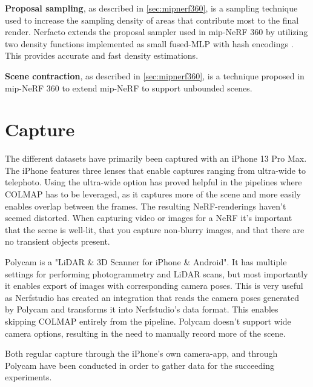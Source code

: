 \textbf{Proposal sampling}, as described in \autoref{sec:mipnerf360}, is a sampling technique used to increase the sampling density of areas that contribute most to the final render. Nerfacto extends the proposal sampler used in mip-NeRF 360 \cite{barron_mip-nerf_2022} by utilizing two density functions implemented as small fused-MLP with hash encodings \cite{muller_instant_2022}. This provides accurate and fast density estimations.

\textbf{Scene contraction}, as described in \autoref{sec:mipnerf360}, is a technique proposed in mip-NeRF 360 \cite{barron_mip-nerf_2022} to extend mip-NeRF to support unbounded scenes.

\section{Capture}
The different datasets have primarily been captured with an iPhone 13 Pro Max. The iPhone features three lenses that enable captures ranging from ultra-wide to telephoto. Using the ultra-wide option has proved helpful in the pipelines where COLMAP has to be leveraged, as it captures more of the scene and more easily enables overlap between the frames. The resulting NeRF-renderings haven't seemed distorted. When capturing video or images for a NeRF it's important that the scene is well-lit, that you capture non-blurry images, and that there are no transient objects present.

Polycam is a "LiDAR \& 3D Scanner for iPhone \& Android". It has multiple settings for performing photogrammetry and LiDAR scans, but most importantly it enables export of images with corresponding camera poses. This is very useful as Nerfstudio has created an integration that reads the camera poses generated by Polycam and transforms it into Nerfstudio's data format. This enables skipping COLMAP entirely from the pipeline. Polycam doesn't support wide camera options, resulting in the need to manually record more of the scene.

Both regular capture through the iPhone's own camera-app, and through Polycam have been conducted in order to gather data for the succeeding experiments.

